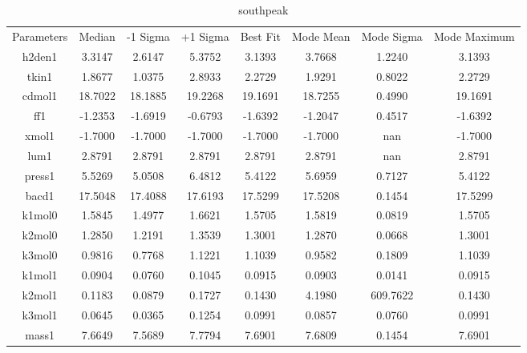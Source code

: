 \begin{table}
\caption{southpeak}
\begin{tabular}{cccccccc}
Parameters & Median & -1 Sigma & +1 Sigma & Best Fit & Mode Mean & Mode Sigma & Mode Maximum \\
h2den1 & 3.3147 & 2.6147 & 5.3752 & 3.1393 & 3.7668 & 1.2240 & 3.1393 \\
tkin1 & 1.8677 & 1.0375 & 2.8933 & 2.2729 & 1.9291 & 0.8022 & 2.2729 \\
cdmol1 & 18.7022 & 18.1885 & 19.2268 & 19.1691 & 18.7255 & 0.4990 & 19.1691 \\
ff1 & -1.2353 & -1.6919 & -0.6793 & -1.6392 & -1.2047 & 0.4517 & -1.6392 \\
xmol1 & -1.7000 & -1.7000 & -1.7000 & -1.7000 & -1.7000 & nan & -1.7000 \\
lum1 & 2.8791 & 2.8791 & 2.8791 & 2.8791 & 2.8791 & nan & 2.8791 \\
press1 & 5.5269 & 5.0508 & 6.4812 & 5.4122 & 5.6959 & 0.7127 & 5.4122 \\
bacd1 & 17.5048 & 17.4088 & 17.6193 & 17.5299 & 17.5208 & 0.1454 & 17.5299 \\
k1mol0 & 1.5845 & 1.4977 & 1.6621 & 1.5705 & 1.5819 & 0.0819 & 1.5705 \\
k2mol0 & 1.2850 & 1.2191 & 1.3539 & 1.3001 & 1.2870 & 0.0668 & 1.3001 \\
k3mol0 & 0.9816 & 0.7768 & 1.1221 & 1.1039 & 0.9582 & 0.1809 & 1.1039 \\
k1mol1 & 0.0904 & 0.0760 & 0.1045 & 0.0915 & 0.0903 & 0.0141 & 0.0915 \\
k2mol1 & 0.1183 & 0.0879 & 0.1727 & 0.1430 & 4.1980 & 609.7622 & 0.1430 \\
k3mol1 & 0.0645 & 0.0365 & 0.1254 & 0.0991 & 0.0857 & 0.0760 & 0.0991 \\
mass1 & 7.6649 & 7.5689 & 7.7794 & 7.6901 & 7.6809 & 0.1454 & 7.6901 \\
\end{tabular}
\end{table}
